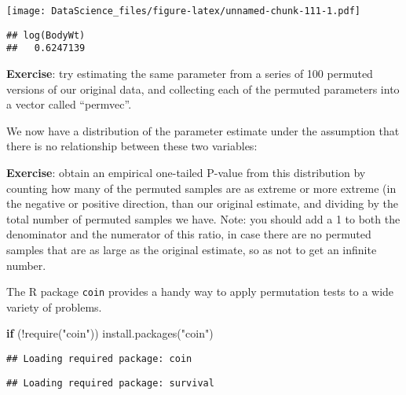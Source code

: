 \documentclass[
]{book}
\newenvironment{Shaded}{\begin{snugshade}}{\end{snugshade}}
\newcommand{\AttributeTok}[1]{\textcolor[rgb]{0.77,0.63,0.00}{#1}}
\newcommand{\ControlFlowTok}[1]{\textcolor[rgb]{0.13,0.29,0.53}{\textbf{#1}}}
\newcommand{\DecValTok}[1]{\textcolor[rgb]{0.00,0.00,0.81}{#1}}
\newcommand{\FunctionTok}[1]{\textcolor[rgb]{0.00,0.00,0.00}{#1}}
\newcommand{\NormalTok}[1]{#1}
\newcommand{\OtherTok}[1]{\textcolor[rgb]{0.56,0.35,0.01}{#1}}
\newcommand{\SpecialCharTok}[1]{\textcolor[rgb]{0.00,0.00,0.00}{#1}}
\newcommand{\StringTok}[1]{\textcolor[rgb]{0.31,0.60,0.02}{#1}}
\begin{document}
\texttt{[image: DataScience\_files/figure-latex/unnamed-chunk-111-1.pdf]}

\begin{Shaded}
\end{Shaded}

\begin{verbatim}
## log(BodyWt) 
##   0.6247139
\end{verbatim}

\textbf{Exercise}: try estimating the same parameter from a series of 100 permuted versions of our original data, and collecting each of the permuted parameters into a vector called ``permvec''.

We now have a distribution of the parameter estimate under the assumption that there is no relationship between these two variables:

\textbf{Exercise}: obtain an empirical one-tailed P-value from this distribution by counting how many of the permuted samples are as extreme or more extreme (in the negative or positive direction, than our original estimate, and dividing by the total number of permuted samples we have. Note: you should add a 1 to both the denominator and the numerator of this ratio, in case there are no permuted samples that are as large as the original estimate, so as not to get an infinite number.

The R package \texttt{coin} provides a handy way to apply permutation tests to a wide variety of problems.

\begin{Shaded}
\begin{Highlighting}[]
\ControlFlowTok{if}\NormalTok{ (}\SpecialCharTok{!}\FunctionTok{require}\NormalTok{(}\StringTok{"coin"}\NormalTok{)) }\FunctionTok{install.packages}\NormalTok{(}\StringTok{"coin"}\NormalTok{)}
\end{Highlighting}
\end{Shaded}

\begin{verbatim}
## Loading required package: coin
\end{verbatim}

\begin{verbatim}
## Loading required package: survival
\end{verbatim}
\end{document}
